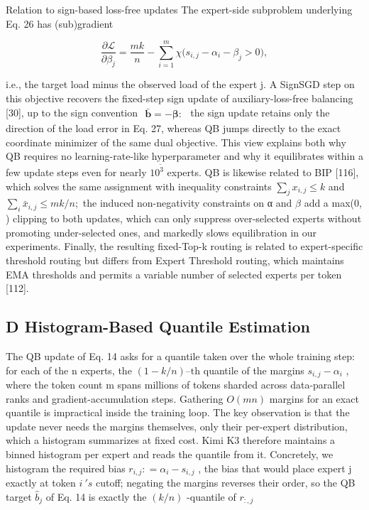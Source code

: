 \documentclass[
  10
]{article}
\begin{document}
Relation to sign-based loss-free updates The expert-side subproblem
underlying Eq. 26 has (sub)gradient

\[
\frac {\partial \mathcal {L}}{\partial \beta_ {j}} = \frac {m k}{n} - \sum_ {i = 1} ^ {m} \chi \big (s _ {i, j} - \alpha_ {i} - \beta_ {j} > 0 \big),\tag{27}
\]

i.e., the target load minus the observed load of the expert j. A SignSGD
step on this objective recovers the fixed-step sign update of
auxiliary-loss-free balancing {[}30{]}, up to the sign convention
\(\begin{array} { r } { \bar { \boldsymbol { b } } = - \boldsymbol { \beta } : } \end{array}\)
the sign update retains only the direction of the load error in Eq. 27,
whereas QB jumps directly to the exact coordinate minimizer of the same
dual objective. This view explains both why QB requires no
learning-rate-like hyperparameter and why it equilibrates within a few
update steps even for nearly \(1 0 ^ { \tilde { 3 } }\) experts. QB is
likewise related to BIP {[}116{]}, which solves the same assignment with
inequality constraints \(\textstyle \sum _ { j } x _ { i , j } \leq k\)
and
\(\textstyle \sum _ { i } { \bar { x } } _ { i , j } \leq m k / n ;\)
the induced non-negativity constraints on α and \(\beta\) add a max(0, )
clipping to both updates, which can only suppress over-selected experts
without promoting under-selected ones, and markedly slows equilibration
in our experiments. Finally, the resulting fixed-Top-k routing is
related to expert-specific threshold routing but differs from Expert
Threshold routing, which maintains EMA thresholds and permits a variable
number of selected experts per token {[}112{]}.

\subsection{D Histogram-Based Quantile
Estimation}\label{d-histogram-based-quantile-estimation}

The QB update of Eq. 14 asks for a quantile taken over the whole
training step: for each of the n experts, the
\(( 1 - k / n ) – \mathrm { t h }\) quantile of the margins
\(s _ { i , j } - \alpha _ { i }\) , where the token count m spans
millions of tokens sharded across data-parallel ranks and
gradient-accumulation steps. Gathering \(O ( m n )\) margins for an
exact quantile is impractical inside the training loop. The key
observation is that the update never needs the margins themselves, only
their per-expert distribution, which a histogram summarizes at fixed
cost. Kimi K3 therefore maintains a binned histogram per expert and
reads the quantile from it. Concretely, we histogram the required bias
\(r _ { i , j } : = \alpha _ { i } - s _ { i , j }\) , the bias that
would place expert j exactly at token \(i \ ' s\) cutoff; negating the
margins reverses their order, so the QB target
\(\widehat { b } _ { j }\) of Eq. 14 is exactly the
\(\left( k / n \right)\) -quantile of \(r _ { : , j }\)
\end{document}

